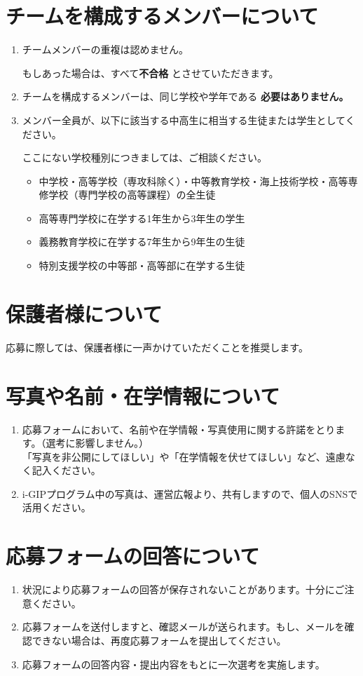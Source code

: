 \documentclass[10.5pt]{jsarticle}
\begin{document}
\section{チームを構成するメンバーについて}
\begin{enumerate}
\item チームメンバーの重複は認めません。\par
もしあった場合は、すべて{\bf 不合格 }とさせていただきます。
\item チームを構成するメンバーは、同じ学校や学年である{ \bf 必要はありません。}
\item メンバー全員が、以下に該当する中高生に相当する生徒または学生としてください。\par
ここにない学校種別につきましては、ご相談ください。
\begin{itemize}
\item 中学校・高等学校{\small（専攻科除く）}・中等教育学校・海上技術学校・高等専修学校{\small（専門学校の高等課程）}の全生徒
\item 高等専門学校に在学する1年生から3年生の学生
\item 義務教育学校に在学する7年生から9年生の生徒
\item 特別支援学校の中等部・高等部に在学する生徒
\end{itemize}
\end{enumerate}


\section{保護者様について}
応募に際しては、保護者様に一声かけていただくことを推奨します。

\section{写真や名前・在学情報について}
\begin{enumerate}
\item 応募フォームにおいて、名前や在学情報・写真使用に関する許諾をとります。（選考に影響しません。）\\
	「写真を非公開にしてほしい」や「在学情報を伏せてほしい」など、遠慮なく記入ください。
\item i-GIPプログラム中の写真は、運営広報より、共有しますので、個人のSNSで活用ください。
\end{enumerate}

\section{応募フォームの回答について}
\begin{enumerate}
\item 状況により応募フォームの回答が保存されないことがあります。十分にご注意ください。
\item 応募フォームを送付しますと、確認メールが送られます。もし、メールを確認できない場合は、再度応募フォームを提出してください。
\item 応募フォームの回答内容・提出内容をもとに一次選考を実施します。
\end{enumerate}
\end{document}
